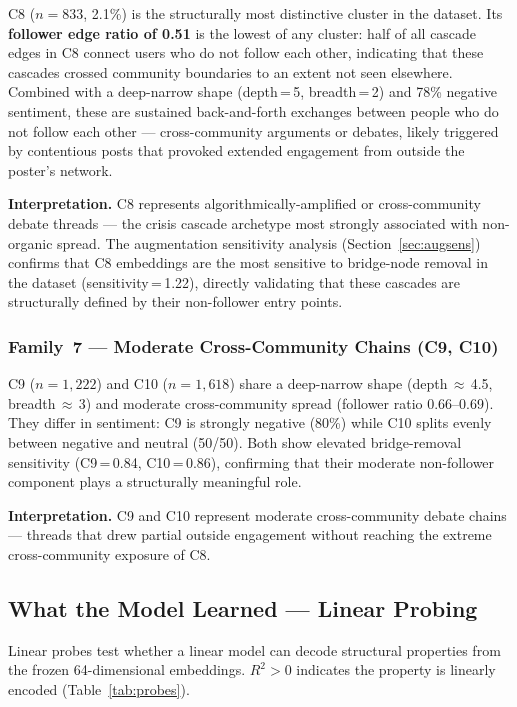 \documentclass[12pt, a4paper]{article}
\begin{document}
C8 ($n\!=\!833$, 2.1\%) is the structurally most distinctive cluster in the dataset. Its \textbf{follower edge ratio of 0.51} is the lowest of any cluster: half of all cascade edges in C8 connect users who do not follow each other, indicating that these cascades crossed community boundaries to an extent not seen elsewhere. Combined with a deep-narrow shape (depth\,=\,5, breadth\,=\,2) and 78\% negative sentiment, these are sustained back-and-forth exchanges between people who do not follow each other --- cross-community arguments or debates, likely triggered by contentious posts that provoked extended engagement from outside the poster's network.

\textbf{Interpretation.} C8 represents algorithmically-amplified or cross-community debate threads --- the crisis cascade archetype most strongly associated with non-organic spread. The augmentation sensitivity analysis (Section~\ref{sec:augsens}) confirms that C8 embeddings are the most sensitive to bridge-node removal in the dataset (sensitivity\,=\,1.22), directly validating that these cascades are structurally defined by their non-follower entry points.

\subsubsection*{Family~7 --- Moderate Cross-Community Chains (C9, C10)}

C9 ($n\!=\!1{,}222$) and C10 ($n\!=\!1{,}618$) share a deep-narrow shape (depth\,$\approx$\,4.5, breadth\,$\approx$\,3) and moderate cross-community spread (follower ratio 0.66--0.69). They differ in sentiment: C9 is strongly negative (80\%) while C10 splits evenly between negative and neutral (50/50). Both show elevated bridge-removal sensitivity (C9\,=\,0.84, C10\,=\,0.86), confirming that their moderate non-follower component plays a structurally meaningful role.

\textbf{Interpretation.} C9 and C10 represent moderate cross-community debate chains --- threads that drew partial outside engagement without reaching the extreme cross-community exposure of C8.

\subsection{What the Model Learned --- Linear Probing}
\label{sec:probing}

Linear probes test whether a linear model can decode structural properties from the frozen 64-dimensional embeddings. $R^2 > 0$ indicates the property is linearly encoded (Table~\ref{tab:probes}).
\end{document}
